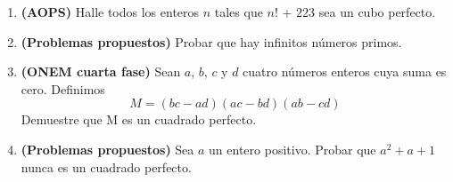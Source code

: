 \documentclass[10pt,a4 paper]{article}
\begin{document}
\begin{enumerate}
\item \textbf{(AOPS)} Halle todos los enteros $n$ tales que $n$! + $223$ sea un cubo perfecto. 

\item \textbf{(Problemas propuestos)} Probar que hay infinitos n\'umeros primos.  

\item \textbf{(ONEM cuarta fase)} Sean $a$, $b$, $c$ y $d$ cuatro n\'umeros enteros cuya suma es cero. Definimos 
$$M = (bc - ad)(ac - bd)(ab - cd)$$
Demuestre que M es un cuadrado perfecto.

\item \textbf{(Problemas propuestos)} Sea $a$ un entero positivo. Probar que $a^{2} + a + 1$ nunca es un cuadrado perfecto. 


\end{enumerate}
\end{document}

